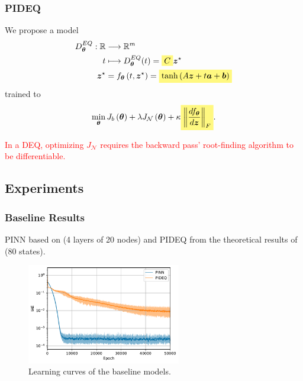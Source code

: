 \documentclass[t]{beamer}
\newcommand{\R}{\mathbb{R}}
\newcommand{\highlight}[1]{%
  \colorbox{yellow!50}{$\displaystyle#1$}}
\begin{document}
\begin{frame}
    \frametitle{PIDEQ}
    We propose a model 
    \begin{align*}
	D^{EQ}_{\bm{\theta}}: \R &\longrightarrow \R^{m} \\
	t &\longmapsto 	D^{EQ}_{\bm{\theta}}(	t) = \highlight{C} \bm{z}^{\star} \\
	\bm{z}^{\star} &= f_{\bm{\theta}}\left( t, \bm{z}^{\star} \right)= \highlight{\tanh \left( A\bm{z} + t\bm{a} + \bm{b} \right)}
    \end{align*}
    trained to \[
     \min_{\bm{\theta}} J_b\left( \bm{\theta} \right) + \lambda J_{\mathcal{N}}\left( \bm{\theta} \right) + \kappa \highlight{\left\lVert \frac{d f_{\bm{\theta}}}{d \bm{z}}\right\rVert_F}
    .\] \pause
    
    \textcolor{red}{In a DEQ, optimizing $J_{\mathcal{N}}$ requires the backward pass' root-finding algorithm to be differentiable.}
\end{frame}

\subsection{Experiments}

\begin{frame}
    \frametitle{Baseline Results}
    PINN based on \textcite{Antonelo2021} (4 layers of 20 nodes) and PIDEQ from the theoretical results of \textcite{Ghaoui2019} (80 states).

    \begin{figure}[h]
	\centering
	\includegraphics[width=0.6\textwidth]{../images/exp_1_iae.pdf}
	\caption{Learning curves of the baseline models.}
	\label{fig:baseline-iae}
    \end{figure}
\end{frame}
\end{document}
